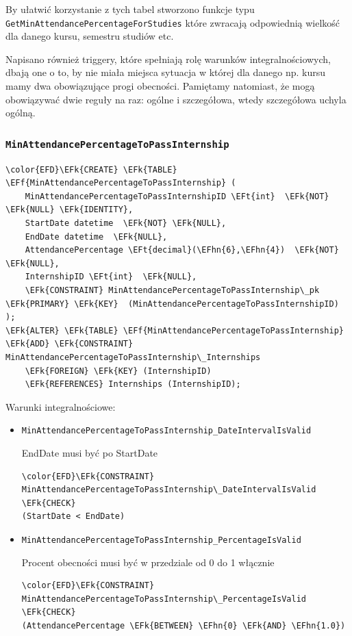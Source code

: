 \documentclass[11pt]{article}
\newcommand{\EFk}[1]{\textcolor{EFk}{\textbf{#1}}} %
\newcommand{\EFf}[1]{\textcolor{EFf}{#1}} %
\newcommand{\EFt}[1]{\textcolor{EFt}{\textbf{#1}}} %
\newcommand{\EFhn}[1]{\textcolor{EFhn}{#1}} %
\begin{document}
By ułatwić korzystanie z tych tabel stworzono funkcje typu \texttt{GetMinAttendancePercentageForStudies} które zwracają odpowiednią wielkość dla danego kursu, semestru studiów etc.

Napisano również triggery, które spełniają rolę warunków integralnościowych, dbają one o to, by
nie miała miejsca sytuacja w której dla danego np. kursu mamy dwa obowiązujące progi obecności.
Pamiętamy natomiast, że mogą obowiązywać dwie reguły na raz: ogólne i szczegółowa, wtedy
szczegółowa uchyla ogólną.
\subsubsection{\texttt{MinAttendancePercentageToPassInternship}}
\label{sec:orgdef81a4}
\begin{Code}
\begin{Verbatim}
\color{EFD}\EFk{CREATE} \EFk{TABLE} \EFf{MinAttendancePercentageToPassInternship} (
    MinAttendancePercentageToPassInternshipID \EFt{int}  \EFk{NOT} \EFk{NULL} \EFk{IDENTITY},
    StartDate datetime  \EFk{NOT} \EFk{NULL},
    EndDate datetime  \EFk{NULL},
    AttendancePercentage \EFt{decimal}(\EFhn{6},\EFhn{4})  \EFk{NOT} \EFk{NULL},
    InternshipID \EFt{int}  \EFk{NULL},
    \EFk{CONSTRAINT} MinAttendancePercentageToPassInternship\_pk \EFk{PRIMARY} \EFk{KEY}  (MinAttendancePercentageToPassInternshipID)
);
\EFk{ALTER} \EFk{TABLE} \EFf{MinAttendancePercentageToPassInternship} \EFk{ADD} \EFk{CONSTRAINT} MinAttendancePercentageToPassInternship\_Internships
    \EFk{FOREIGN} \EFk{KEY} (InternshipID)
    \EFk{REFERENCES} Internships (InternshipID);
\end{Verbatim}
\end{Code}
Warunki integralnościowe:


\begin{itemize}
\item \texttt{MinAttendancePercentageToPassInternship\_DateIntervalIsValid}

EndDate musi być po StartDate
\begin{Code}
\begin{Verbatim}
\color{EFD}\EFk{CONSTRAINT} MinAttendancePercentageToPassInternship\_DateIntervalIsValid \EFk{CHECK}
(StartDate < EndDate)
\end{Verbatim}
\end{Code}
\item \texttt{MinAttendancePercentageToPassInternship\_PercentageIsValid}

Procent obecności musi być w przedziale od 0 do 1 włącznie
\begin{Code}
\begin{Verbatim}
\color{EFD}\EFk{CONSTRAINT} MinAttendancePercentageToPassInternship\_PercentageIsValid \EFk{CHECK}
(AttendancePercentage \EFk{BETWEEN} \EFhn{0} \EFk{AND} \EFhn{1.0})
\end{Verbatim}
\end{Code}
\end{itemize}
\end{document}
